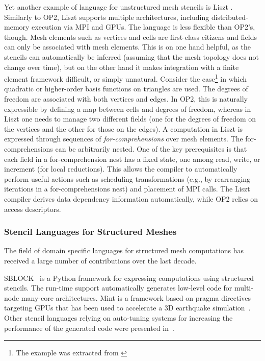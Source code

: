 Yet another example of language for unstructured mesh stencils is Liszt \citep{lizst}. Similarly to OP2, Liszt supports multiple architectures, including distributed-memory execution via MPI and GPUs. The language is less flexible than OP2's, though. Mesh elements such as vertices and cells are first-class citizens and fields can only be associated with mesh elements. This is on one hand helpful, as the stencils can automatically be inferred (assuming that the mesh topology does not change over time), but on the other hand it makes integration with a finite element framework difficult, or simply unnatural. Consider the case\footnote{The example was extracted from \cite{florian-thesis}} in which quadratic or higher-order basis functions on triangles are used. The degrees of freedom are associated with both vertices and edges. In OP2, this is naturally expressible by defining a map between cells and degrees of freedom, whereas in Liszt one needs to manage two different fields (one for the degrees of freedom on the vertices and the other for those on the edges). A computation in Liszt is expressed through sequences of {\em for-comprehensions} over mesh elements. The for-comprehensions can be arbitrarily nested. One of the key prerequisites is that each field in a for-comprehension nest has a fixed state, one among read, write, or increment (for local reductions). This allows the compiler to automatically perform useful actions such as scheduling transformations (e.g., by rearranging iterations in a for-comprehensions nest) and placement of MPI calls. The Liszt compiler derives data dependency information automatically, while OP2 relies on access descriptors. 

\subsubsection{Stencil Languages for Structured Meshes}
The field of domain specific languages for structured mesh computations has received a large number of contributions over the last decade. 

SBLOCK~\citep{sblock-cite} is a Python framework for expressing computations using structured stencils. The run-time support automatically generates low-level code for multi-node many-core architectures. Mint is a framework based on pragma directives targeting GPUs that has been used to accelerate a 3D earthquake simulation~\citep{mint-simulation-cite}. Other stencil languages relying on auto-tuning systems for increasing the performance of the generated code were presented in~\cite{zhang-mueller-cite,datta-cite,patus}. 


